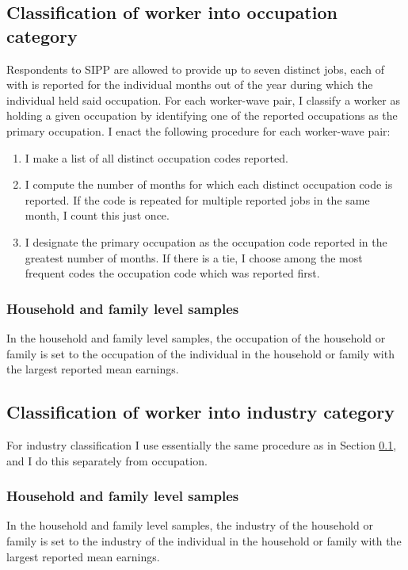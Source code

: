 \documentclass{article}
\begin{document}
\subsection{Classification of worker into occupation category}
\label{sipp_occupation}
Respondents to SIPP are allowed to provide up to seven distinct jobs, each of with is reported for the individual months out of the year during which the individual held said occupation.
For each worker-wave pair, I classify a worker as holding a given occupation by identifying one of the reported occupations as the primary occupation. I enact the following procedure for each worker-wave pair:
\begin{enumerate}
\item I make a list of all distinct occupation codes reported.
\item I compute the number of months for which each distinct occupation code is reported. If the code is repeated for multiple reported jobs in the same month, I count this just once.
\item I designate the primary occupation as the occupation code reported in the greatest number of months. If there is a tie, I choose among the most frequent codes the occupation code which was reported first.
\end{enumerate}

\subsubsection{Household and family level samples}
In the household and family level samples, the occupation of the household or family is set to the occupation of the individual in the household or family with the largest reported mean earnings.

\subsection{Classification of worker into industry category}
For industry classification I use essentially the same procedure as in Section \ref{sipp_occupation}, and I do this separately from occupation.

\subsubsection{Household and family level samples}
In the household and family level samples, the industry of the household or family is set to the industry of the individual in the household or family with the largest reported mean earnings.
\end{document}
